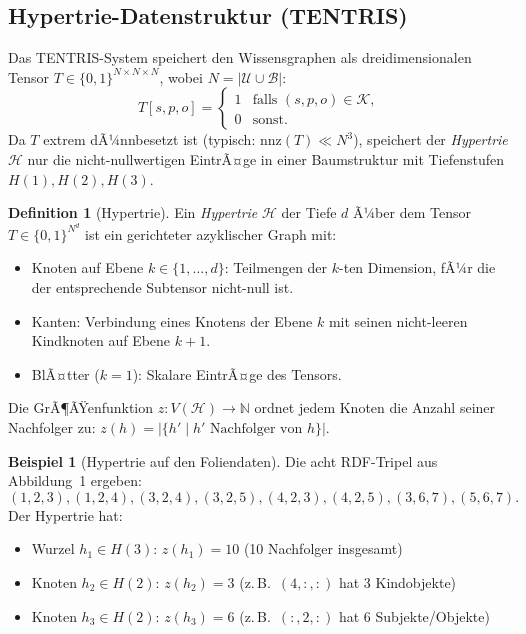 ﻿\documentclass[a4paper,12pt]{article}
\theoremstyle{definition}
\newtheorem{definition}{Definition}
\newtheorem{beispiel}{Beispiel}
\begin{document}
\subsection{Hypertrie-Datenstruktur (TENTRIS)}

Das TENTRIS-System speichert den Wissensgraphen als dreidimensionalen Tensor
$T \in \{0,1\}^{N \times N \times N}$, wobei $N = |\mathcal{U} \cup \mathcal{B}|$:
\[
  T[s,p,o] = \begin{cases} 1 & \text{falls } (s,p,o) \in \mathcal{K}, \\ 0 & \text{sonst}.\end{cases}
\]
Da $T$ extrem dÃ¼nnbesetzt ist (typisch: $\mathrm{nnz}(T) \ll N^3$), speichert der
\emph{Hypertrie} $\mathcal{H}$ nur die nicht-nullwertigen EintrÃ¤ge in einer
Baumstruktur mit Tiefenstufen $H(1), H(2), H(3)$.

\begin{definition}[Hypertrie]
\label{def:hypertrie}
Ein \emph{Hypertrie} $\mathcal{H}$ der Tiefe $d$ Ã¼ber dem Tensor $T \in \{0,1\}^{N^d}$
ist ein gerichteter azyklischer Graph mit:
\begin{itemize}
  \item Knoten auf Ebene $k \in \{1, \ldots, d\}$: Teilmengen der $k$-ten Dimension,
        fÃ¼r die der entsprechende Subtensor nicht-null ist.
  \item Kanten: Verbindung eines Knotens der Ebene $k$ mit seinen nicht-leeren
        Kindknoten auf Ebene $k+1$.
  \item BlÃ¤tter ($k=1$): Skalare EintrÃ¤ge des Tensors.
\end{itemize}
Die GrÃ¶ÃŸenfunktion $z: V(\mathcal{H}) \to \mathbb{N}$ ordnet jedem Knoten die Anzahl
seiner Nachfolger zu: $z(h) = |\{h' \mid h' \text{ Nachfolger von } h\}|$.
\end{definition}

\begin{beispiel}[Hypertrie auf den Foliendaten]
Die acht RDF-Tripel aus Abbildung~1 ergeben:
\[
  (1,2,3),(1,2,4),(3,2,4),(3,2,5),(4,2,3),(4,2,5),(3,6,7),(5,6,7).
\]
Der Hypertrie hat:
\begin{itemize}
  \item Wurzel $h_1 \in H(3)$: $z(h_1) = 10$ (10 Nachfolger insgesamt)
  \item Knoten $h_2 \in H(2)$: $z(h_2) = 3$ (z.\,B.\ $(4,:,:)$ hat 3 Kindobjekte)
  \item Knoten $h_3 \in H(2)$: $z(h_3) = 6$ (z.\,B.\ $(:,2,:)$ hat 6 Subjekte/Objekte)
\end{itemize}
\end{beispiel}
\end{document}
